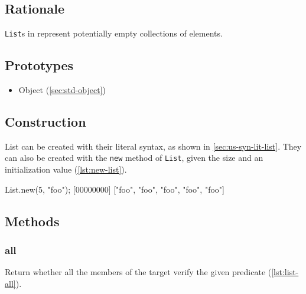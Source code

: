 \subsection{Rationale}

\lstinline|List|s in \us represent potentially empty collections of
elements.

\subsection{Prototypes}

\begin{itemize}
\item Object (\autoref{sec:std-object})
\end{itemize}

\subsection{Construction}

List can be created with their literal syntax, as shown in
\autoref{sec:us-syn-lit-list}. They can also be created with the
\lstinline|new| method of \lstinline|List|, given the size and an
initialization value (\autoref{lst:new-list}).

\begin{urbiscript}[caption=List.new, label=lst:new-list,
  float=\floatposh]
List.new(5, "foo");
[00000000] ["foo", "foo", "foo", "foo", "foo"]
\end{urbiscript}

\subsection{Methods}

\subsubsection{all}

Return whether all the members of the target verify the given
predicate (\autoref{lst:list-all}).


